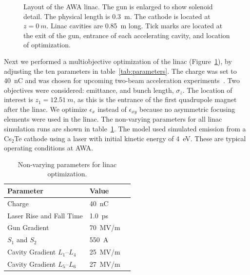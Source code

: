 \begin{figure}
\begin{center}
	\end{center}
	\caption{Layout of the AWA linac.
		The gun is enlarged to show solenoid detail. The physical length is
		\SI{0.3}{m}. The cathode is located at $z=\SI{0}{m}$. Linac cavities are
		\SI{0.85}{m} long. Tick marks are located at the exit of the gun, entrance of
		each accelerating cavity, and location of optimization.}
	\label{fig:beamline} 
\end{figure} 

Next we performed a multiobjective optimization of the linac (Figure~\ref{fig:beamline}), 
by adjusting the ten parameters in table~\ref{tab:parameters}. The charge was set to \SI{40}{nC}
and was chosen for upcoming two-beam acceleration experiments~\cite{tba2017}. 
Two objectives were considered: emittance, and bunch length, $\sigma_z$. 
The location of interest is $z_1=\SI{12.51}{m}$, as this is the entrance of the first 
quadrupole magnet after the linac. We optimize $\epsilon_x$ instead of $\epsilon_{xy}$ because 
no asymmetric focusing elements were used in the linac. 
The non-varying parameters for all linac simulation runs are shown in table~\ref{tab:linac}.
The model used simulated emission
from a Cs$_2$Te cathode using a laser with initial kinetic energy of \SI{4}{eV}. 
These are typical operating conditions at AWA. 
\begin{table}[h] %
	\caption{\label{tab:linac} Non-varying parameters for linac optimization.}
	\begin{center}
		\begin{tabular}{lll}
			\toprule
			\textbf{Parameter} & \textbf{Value} \\
			\midrule
			Charge  & \SI{40}{nC} \\
			Laser Rise and Fall Time & \SI{1.0}{ps} \\
			Gun Gradient & \SI{70}{MV/m} \\
			$S_1$ and $S_2$ & \SI{550}{A}\\
			Cavity Gradient $L_1$--$L_4$ & \SI{25}{MV/m} \\
			Cavity Gradient $L_5$--$L_6$ & \SI{27}{MV/m} \\
			\bottomrule
		\end{tabular}
	\end{center}
\end{table}

